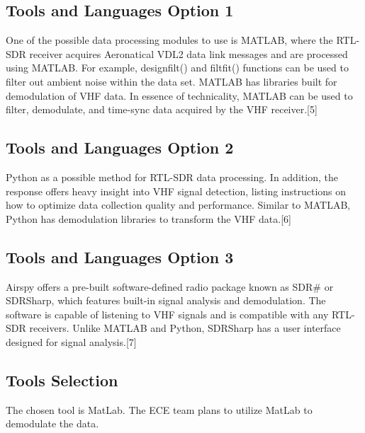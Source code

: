 \documentclass[onecolumn, draftclsnofoot,10pt, compsoc]{IEEEtran}
\begin{document}
\subsection{Tools and Languages Option 1}
One of the possible data processing modules to use is MATLAB, where the RTL-SDR receiver acquires Aeronatical VDL2 data link messages and are processed using MATLAB. For example, designfilt() and filtfit() functions can be used to filter out ambient noise within the data set. MATLAB has libraries built for demodulation of VHF data. In essence of technicality, MATLAB can be used to filter, demodulate, and time-sync data acquired by the VHF receiver.[5]
\subsection{Tools and Languages Option 2}
Python as a possible method for RTL-SDR data processing. In addition, the response offers heavy insight into VHF signal detection, listing instructions on how to optimize data collection quality and performance. Similar to MATLAB, Python has demodulation libraries to transform the VHF data.[6]
\subsection{Tools and Languages Option 3}
Airspy offers a pre-built software-defined radio package known as SDR\# or SDRSharp, which features built-in signal analysis and demodulation. The software is capable of listening to VHF signals and is compatible with any RTL-SDR receivers. Unlike MATLAB and Python, SDRSharp has a user interface designed for signal analysis.[7]
\subsection {Tools Selection}
The chosen tool is MatLab. The ECE team plans to utilize MatLab to demodulate the data.
\end{document}
